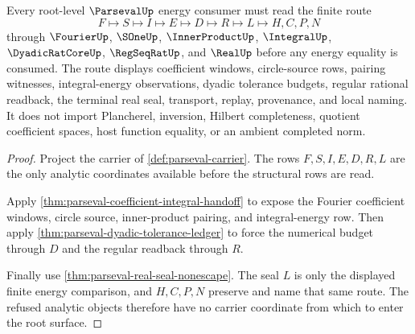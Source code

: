 \begin{theorem}
\label{thm:parseval-root-obligation-surface}
Every root-level $\ParsevalUp$ energy consumer must read the finite route
$$
F\longmapsto S\longmapsto I\longmapsto E\longmapsto D\longmapsto R\longmapsto L\longmapsto H,C,P,N
$$
through $\FourierUp$, $\SOneUp$, $\InnerProductUp$, $\IntegralUp$, $\DyadicRatCoreUp$, $\RegSeqRatUp$, and $\RealUp$ before any energy equality is consumed. The route displays coefficient windows, circle-source rows, pairing witnesses, integral-energy observations, dyadic tolerance budgets, regular rational readback, the terminal real seal, transport, replay, provenance, and local naming. It does not import Plancherel, inversion, Hilbert completeness, quotient coefficient spaces, host function equality, or an ambient completed norm.
\end{theorem}
\begin{proof}
Project the carrier of \autoref{def:parseval-carrier}. The rows $F,S,I,E,D,R,L$ are the only analytic coordinates available before the structural rows are read.

Apply \autoref{thm:parseval-coefficient-integral-handoff} to expose the Fourier coefficient windows, circle source, inner-product pairing, and integral-energy row. Then apply \autoref{thm:parseval-dyadic-tolerance-ledger} to force the numerical budget through $D$ and the regular readback through $R$.

Finally use \autoref{thm:parseval-real-seal-nonescape}. The seal $L$ is only the displayed finite energy comparison, and $H,C,P,N$ preserve and name that same route. The refused analytic objects therefore have no carrier coordinate from which to enter the root surface.
\end{proof}

